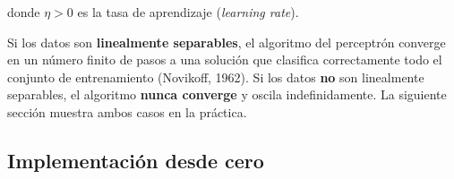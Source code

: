 \documentclass[
  letterpaper,
  DIV=11,
  numbers=noendperiod]{scrartcl}
\begin{document}
donde \(\eta > 0\) es la tasa de aprendizaje (\emph{learning rate}).

\begin{tcolorbox}[enhanced jigsaw, arc=.35mm, bottomrule=.15mm, bottomtitle=1mm, breakable, colback=white, colbacktitle=quarto-callout-important-color!10!white, colframe=quarto-callout-important-color-frame, coltitle=black, left=2mm, leftrule=.75mm, opacityback=0, opacitybacktitle=0.6, rightrule=.15mm, title=\textcolor{quarto-callout-important-color}{\faExclamation}\hspace{0.5em}{Teorema de convergencia del Perceptrón}, titlerule=0mm, toprule=.15mm, toptitle=1mm]

Si los datos son \textbf{linealmente separables}, el algoritmo del
perceptrón converge en un número finito de pasos a una solución que
clasifica correctamente todo el conjunto de entrenamiento (Novikoff,
1962). Si los datos \textbf{no} son linealmente separables, el algoritmo
\textbf{nunca converge} y oscila indefinidamente. La siguiente sección
muestra ambos casos en la práctica.

\end{tcolorbox}

\subsection{Implementación desde
cero}\label{implementaciuxf3n-desde-cero}
\end{document}
